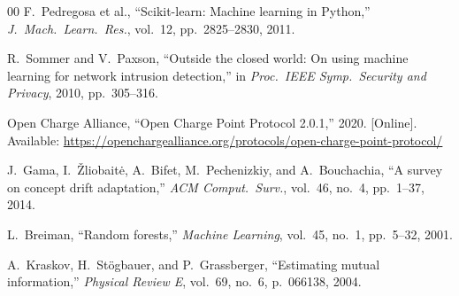 \documentclass[conference]{IEEEtran}
\begin{document}
\begin{thebibliography}{00}
 F.\ Pedregosa et al., ``Scikit-learn: Machine learning in Python,'' \emph{J.\ Mach.\ Learn.\ Res.}, vol.\ 12, pp.\ 2825--2830, 2011.

 R.\ Sommer and V.\ Paxson, ``Outside the closed world: On using machine learning for network intrusion detection,'' in \emph{Proc.\ IEEE Symp.\ Security and Privacy}, 2010, pp.\ 305--316.

 Open Charge Alliance, ``Open Charge Point Protocol 2.0.1,'' 2020. [Online]. Available: \url{https://openchargealliance.org/protocols/open-charge-point-protocol/}

 J.\ Gama, I.\ \v{Z}liobait\.{e}, A.\ Bifet, M.\ Pechenizkiy, and A.\ Bouchachia, ``A survey on concept drift adaptation,'' \emph{ACM Comput.\ Surv.}, vol.\ 46, no.\ 4, pp.\ 1--37, 2014.

 L.\ Breiman, ``Random forests,'' \emph{Machine Learning}, vol.\ 45, no.\ 1, pp.\ 5--32, 2001.

 A.\ Kraskov, H.\ St\"{o}gbauer, and P.\ Grassberger, ``Estimating mutual information,'' \emph{Physical Review E}, vol.\ 69, no.\ 6, p.\ 066138, 2004.

\end{thebibliography}
\end{document}
